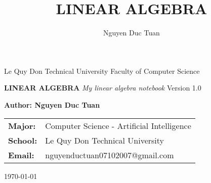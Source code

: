 \documentclass[12pt, a4paper, oneside]{book}
\title{LINEAR ALGEBRA}
\author{Nguyen Duc Tuan}
\begin{document}
\frontmatter 

\begin{titlepage}
    \centering %
    

    {\large Le Quy Don Technical University}
    \vspace{0.25cm}
    {\large Faculty of Computer Science}
    
    \vfill %
    
    {\Huge \bfseries LINEAR ALGEBRA}
    \vspace{0.5cm}
    {\Large \itshape My linear algebra notebook}
    \vspace{1cm}
    {\large Version 1.0} %
    
    \vfill %
    
    {\Large \bfseries Author: Nguyen Duc Tuan}
    \vspace{0.5cm}
    
    \begin{tabular}{l l}
        \bfseries Major: & Computer Science - Artificial Intelligence \\
        \bfseries School: & Le Quy Don Technical University \\
        \bfseries Email: & nguyenductuan07102007@gmail.com \\
    \end{tabular}
    
    \vspace{1cm}
    
    {\large \today}

\end{titlepage}

\tableofcontents 

\mainmatter 

 

\end{document}
